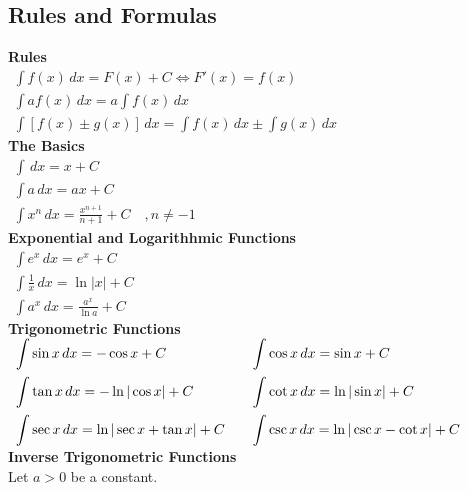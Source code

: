 \documentclass[11pt]{article}
\begin{document}
\subsection{Rules and Formulas}
\textbf{Rules}\\[.5em]
$\begin{array}{l}
        \displaystyle
        \int f(x)\,dx = F(x)+C \iff F'(x) = f(x)\\[10pt]
        \displaystyle
        \int af(x)\,dx = a\int f(x)\,dx\\[10pt]
        \displaystyle
        \int [f(x)\pm g(x)]\,dx = \int f(x)\,dx \pm \int g(x)\, dx
    \end{array}
$\\[1.5em]
\textbf{The Basics}\\[.5em]
$\begin{array}{l}
        \displaystyle
        \int \,dx = x + C\\[10pt]
        \displaystyle
        \int a\,dx = ax + C\\[10pt]
        \displaystyle
        \int x^n\,dx = \frac{x^{n+1}}{n+1}+C\quad, n\neq-1
    \end{array}
$\\[1.5em]
\textbf{Exponential and Logarithhmic Functions}\\[.5em]
$
    \begin{array}{l}
        \displaystyle \int  e^x\,dx = e^x+C\\[10pt]
        \displaystyle \int \frac{1}{x}\,dx= \ln|x|+C\\[10pt]
        \displaystyle \int a^x\,dx = \frac{a^x}{\ln a}+C
    \end{array}
$\\[1.5em]
\textbf{Trigonometric Functions}\\[.5em]
$
    \begin{array}{l@{\qquad}l}
        \displaystyle \int \sin x\,dx = -\cos x+C 
        & \displaystyle \int \cos x\,dx = \sin x+C \\[10pt]
        \displaystyle \int \tan x \,dx= -\ln|\cos x|+C
        & \displaystyle \int \cot x \,dx= \ln|\sin x|+C\\[10pt]
        \displaystyle \int \sec x\,dx = \ln|\sec x+\tan x|+C 
        & \displaystyle \int \csc x\,dx = \ln|\csc x -\cot x|+C
    \end{array}
$\\[1.5em]
\textbf{Inverse Trigonometric Functions}\\
Let $a > 0$ be a constant.\\[.5em]
\end{document}
